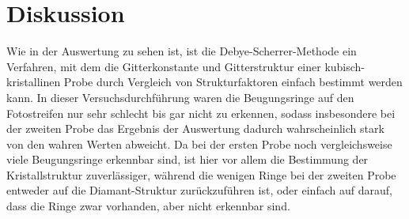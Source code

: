 

\section{Diskussion}
Wie in der Auswertung zu sehen ist, ist die Debye-Scherrer-Methode ein Verfahren, mit 
dem die Gitterkonstante und Gitterstruktur einer kubisch-kristallinen Probe durch 
Vergleich von Strukturfaktoren einfach bestimmt werden kann. In dieser 
Versuchsdurchführung waren die Beugungsringe auf den Fotostreifen nur sehr schlecht 
bis gar nicht zu erkennen, sodass insbesondere bei der zweiten Probe das Ergebnis der 
Auswertung dadurch wahrscheinlich stark von den wahren Werten abweicht. Da bei der 
ersten Probe noch vergleichsweise viele Beugungsringe erkennbar sind, ist hier vor 
allem die Bestimmung der Kristallstruktur zuverlässiger, während die wenigen Ringe 
bei der zweiten Probe entweder auf die Diamant-Struktur zurückzuführen ist, oder 
einfach auf darauf, dass die Ringe zwar vorhanden, aber nicht erkennbar sind.